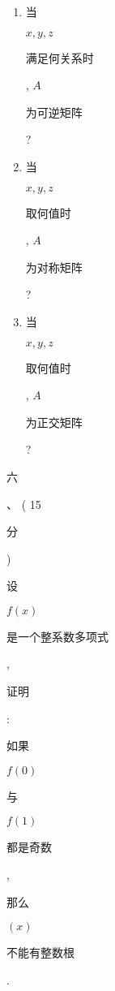 \documentclass[10pt]{article}
\begin{document}
\begin{enumerate}
  \item \begin{CJK}{UTF8}{mj}当\end{CJK} $x, y, z$ \begin{CJK}{UTF8}{mj}满足何关系时\end{CJK}, $A$ \begin{CJK}{UTF8}{mj}为可逆矩阵\end{CJK}?

  \item \begin{CJK}{UTF8}{mj}当\end{CJK} $x, y, z$ \begin{CJK}{UTF8}{mj}取何值时\end{CJK}, $A$ \begin{CJK}{UTF8}{mj}为对称矩阵\end{CJK}?

  \item \begin{CJK}{UTF8}{mj}当\end{CJK} $x, y, z$ \begin{CJK}{UTF8}{mj}取何值时\end{CJK}, $A$ \begin{CJK}{UTF8}{mj}为正交矩阵\end{CJK}?

\end{enumerate}
\begin{CJK}{UTF8}{mj}六\end{CJK}、 ( 15 \begin{CJK}{UTF8}{mj}分\end{CJK}) \begin{CJK}{UTF8}{mj}设\end{CJK} $f(x)$ \begin{CJK}{UTF8}{mj}是一个整系数多项式\end{CJK}, \begin{CJK}{UTF8}{mj}证明\end{CJK}: \begin{CJK}{UTF8}{mj}如果\end{CJK} $f(0)$ \begin{CJK}{UTF8}{mj}与\end{CJK} $f(1)$ \begin{CJK}{UTF8}{mj}都是奇数\end{CJK}, \begin{CJK}{UTF8}{mj}那么\end{CJK} $(x)$ \begin{CJK}{UTF8}{mj}不能有整数根\end{CJK}.
\end{document}
